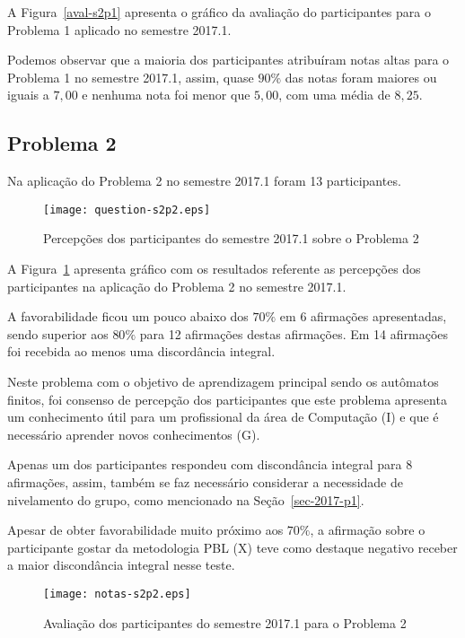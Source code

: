 A Figura~\ref{aval-s2p1} apresenta o gráfico da
avaliação do participantes para o Problema 1 aplicado no semestre 2017.1.

Podemos observar que a maioria dos participantes atribuíram
notas altas para o Problema 1 no semestre 2017.1, assim, quase $90\%$ das notas
foram maiores ou iguais a $7,00$ e nenhuma nota foi menor que $5,00$, com uma média
de $8,25$.

\subsection{Problema 2}
Na aplicação do Problema 2 no semestre 2017.1 foram 13 participantes.

\begin{figure}[!htb]
\centering
\texttt{[image: question-s2p2.eps]}
\caption{Percepções dos participantes do semestre 2017.1 sobre o Problema 2}
\label{percep-s2p2}
\end{figure}

A Figura~\ref{percep-s2p2} apresenta gráfico com os resultados referente
as percepções dos participantes na aplicação do
Problema 2 no semestre 2017.1.


A favorabilidade ficou um pouco abaixo dos $70\%$ em 6 afirmações apresentadas,
sendo superior aos $80\%$ para 12 afirmações destas afirmações.
Em 14 afirmações foi recebida ao menos uma discordância integral.

Neste problema com o objetivo de aprendizagem principal sendo
os autômatos finitos, foi consenso de percepção dos participantes que
este problema apresenta um conhecimento útil para um profissional
da área de Computação (I) e que é necessário aprender novos
conhecimentos (G).

Apenas um dos participantes respondeu com discondância integral para
8 afirmações, assim, também se faz necessário considerar a
necessidade de nivelamento do grupo, como mencionado
na Seção~\ref{sec-2017-p1}.

Apesar de obter favorabilidade muito próximo aos $70\%$, a afirmação
sobre o participante gostar da metodologia PBL (X) teve como
destaque negativo receber a maior discondância integral nesse
teste.

\begin{figure}[!htb]
\centering
\texttt{[image: notas-s2p2.eps]}
\caption{Avaliação dos participantes do semestre 2017.1 para o Problema 2}
\label{aval-s2p2}
\end{figure}

